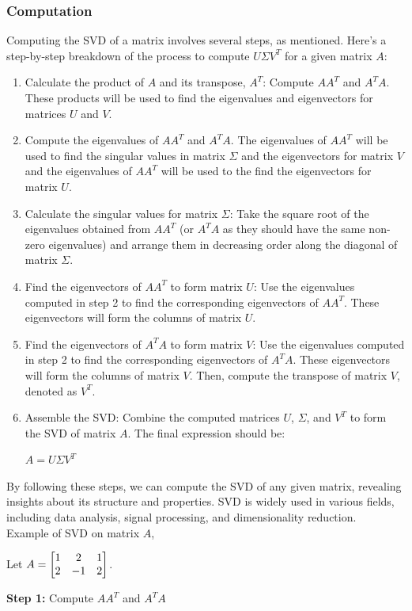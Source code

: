 \documentclass[12pt]{article}
\begin{document}
\subsubsection{Computation}
Computing the SVD of a matrix involves several steps, as mentioned. Here's a step-by-step breakdown of the process to compute $U \Sigma V^T$ for a given matrix $A$:
\begin{enumerate}
    \item Calculate the product of $A$ and its transpose, $A^T$: Compute $AA^T$ and $A^TA$. These products will be used to find the eigenvalues and eigenvectors for matrices $U$ and $V$.

    \item Compute the eigenvalues of $AA^T$ and $A^TA$. The eigenvalues of $AA^T$ will be used to find the singular values in matrix $\Sigma$ and the eigenvectors for matrix $V$ and the eigenvalues of $AA^T$ will be used to the find the eigenvectors for matrix $U$.

    \item Calculate the singular values for matrix $\Sigma$: Take the square root of the eigenvalues obtained from $AA^T$ (or $A^TA$ as they should have the same non-zero eigenvalues) and arrange them in decreasing order along the diagonal of matrix $\Sigma$.

    \item Find the eigenvectors of $AA^T$ to form matrix $U$: Use the eigenvalues computed in step 2 to find the corresponding eigenvectors of $AA^T$. These eigenvectors will form the columns of matrix $U$.

    \item Find the eigenvectors of $A^TA$ to form matrix $V$: Use the eigenvalues computed in step 2 to find the corresponding eigenvectors of $A^TA$. These eigenvectors will form the columns of matrix $V$. Then, compute the transpose of matrix $V$, denoted as $V^T$.

    \item Assemble the SVD: Combine the computed matrices $U$, $\Sigma$, and $V^T$ to form the SVD of matrix $A$. The final expression should be:
    \begin{center}
    $A = U \Sigma V^T$
    \end{center}
\end{enumerate}
By following these steps, we can compute the SVD of any given matrix, revealing insights about its structure and properties. SVD is widely used in various fields, including data analysis, signal processing, and dimensionality reduction.\\
\newline
Example of SVD on matrix $A$,
\begin{center}
Let $A=\begin{bmatrix}
1 &  2  & 1 \cr
2 & -1 & 2 \cr
\end{bmatrix}$. \\
\end{center}
\textbf{Step 1:} Compute $AA^T$ and $A^TA$\\
\newline
\end{document}
